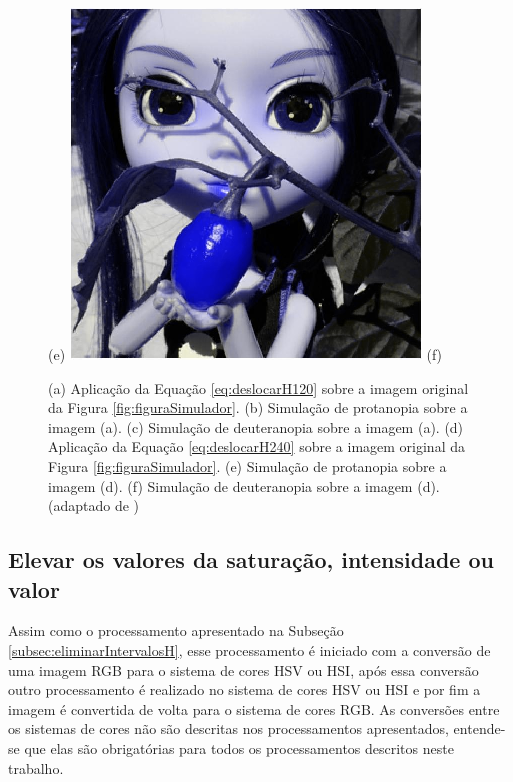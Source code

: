 \documentclass[	12pt, Times, openright, twoside, a4paper, english, brazil]{abntex2}
\begin{document}
\begin{figure}[!htb]
(e)
\endminipage\hfill
{}
\centering
{\includegraphics[width=\linewidth]{figuraPimenta240Deutran.png}}
(f)
\endminipage\hfill
\caption{
(a) Aplicação da Equação \ref{eq:deslocarH120} sobre a imagem original da Figura \ref{fig:figuraSimulador}. (b) Simulação de protanopia sobre a imagem (a). (c) Simulação de deuteranopia sobre a imagem (a). (d) Aplicação da Equação \ref{eq:deslocarH240} sobre a imagem original da Figura \ref{fig:figuraSimulador}. (e) Simulação de protanopia sobre a imagem (d).
(f) Simulação de deuteranopia sobre a imagem (d). (adaptado de )}
\label{fig:figuraSimulacaoH}
\end{figure}

\subsection{Elevar os valores da saturação, intensidade ou valor}
\label{subsec:deslocarVouI}

Assim como o processamento apresentado na Subseção \ref{subsec:eliminarIntervalosH}, esse processamento é iniciado com a conversão de uma imagem RGB para o sistema de cores HSV ou HSI, após essa conversão outro processamento é realizado no sistema de cores HSV ou HSI e por fim a imagem é convertida de volta para o sistema de cores RGB. As conversões entre os sistemas de cores não são descritas nos processamentos apresentados, entende-se que elas são obrigatórias para todos os processamentos descritos neste trabalho.
\end{document}
